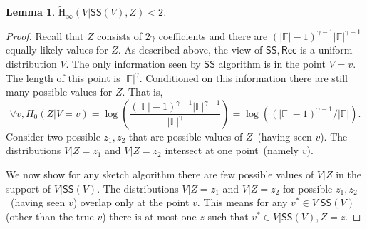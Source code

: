 \documentclass[11pt]{article}
\newcommand{\class}[1]{{\ensuremath{\mathsf{#1}}}}
\newcommand{\sketch}{\ensuremath{\class{SS}}\xspace}
\newcommand{\rec}{\ensuremath{\class{Rec}}\xspace}
\newcommand{\Hav}{\tilde{\mathrm{H}}_\infty}
\newtheorem{lemma}[theorem]{Lemma}
\begin{document}
\begin{lemma}
\label{lem:side info determines sketch}
$\Hav(V | \sketch(V), Z) <2$.
\end{lemma}
\begin{proof}
Recall that $Z$ consists of $2\gamma$ coefficients and there are $(|\mathbb{F}|-1)^{\gamma-1} |\mathbb{F}|^{\gamma-1}$ equally likely values for $Z$.
 As described above, the view of $\sketch, \rec$ is a uniform distribution $V$.  %
 The only information seen by $\sketch$ algorithm is in the point $V=v$.  The length of this point is $|\mathbb{F}|^\gamma$.  Conditioned on this information there are still many possible values for $Z$.  That is, 
 \[
 \forall v, H_0(Z | V=v) =\log \left(\frac{(|\mathbb{F}|-1)^{\gamma-1} |\mathbb{F}|^{\gamma-1}}{|\mathbb{F}|^\gamma}\right) = \log \left( (|\mathbb{F}|-1)^{\gamma-1}/|\mathbb{F}|\right).
 \]
Consider two possible $z_1, z_2$ that are possible values of $Z$~(having seen $v$).  The distributions $V| Z=z_1$ and $V | Z=z_2$ intersect at one point~(namely $v$).  

We now show for any sketch algorithm there are few possible values of $V|Z$ in the support of $V |\sketch(V)$.  The distributions $V | Z=z_1$ and $V| Z=z_2$ for possible $z_1, z_2$~(having seen $v$) overlap only at the point $v$.  This means for any $v^*\in V| \sketch(V)$ (other than the true $v$) there is at most one $z$ such that $v^*\in V | \sketch(V), Z=z$.  


\end{proof}
\end{document}
